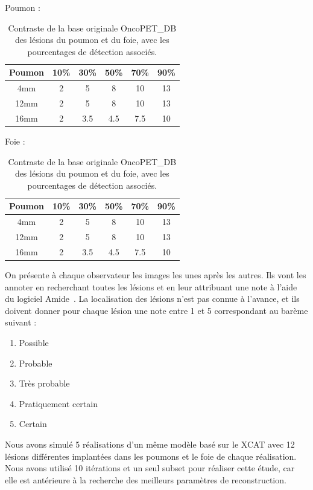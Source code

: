 \begin{table}
\centering
Poumon :\\
\begin{tabular}{|c||c|c|c|c|c|}
 \hline
Poumon	& 10\% & 30\% & 50\% & 70\% & 90\% \\
\hline
4mm	& 2    &  5   &  8   & 10   & 13   \\
\hline
12mm    & 2    &  5   &  8   & 10   & 13   \\
\hline
16mm    & 2    &  3.5 &  4.5 & 7.5  & 10   \\
\hline
\end{tabular}

\vspace{0.5cm}

Foie :\\
\begin{tabular}{|c||c|c|c|c|c|}
 \hline
Poumon	& 10\% & 30\% & 50\% & 70\% & 90\% \\
\hline
4mm	& 2    &  5   &  8   & 10   & 13   \\
\hline
12mm    & 2    &  5   &  8   & 10   & 13   \\
\hline
16mm    & 2    &  3.5 &  4.5 & 7.5  & 10   \\
\hline
\end{tabular}
\caption[Contraste de la base originale OncoPET\_DB des lésions du poumon et du foie pour létude de détectabilité]{Contraste de la base originale OncoPET\_DB des lésions du poumon et du foie, avec les pourcentages de détection associés.}
\label{fig:contrtasteFoiePoumonOrig}
\end{table}


On présente à chaque observateur les images les unes après les autres. Ils vont les annoter en recherchant toutes les lésions et en leur attribuant une note à l'aide du logiciel Amide~\cite{loening2003amide}. La localisation des lésions n'est pas connue à l'avance, et ils doivent donner pour chaque lésion une note entre 1 et 5 correspondant au barème suivant :

\begin{enumerate}
\item Possible
\item Probable
\item Très probable
\item Pratiquement  certain
\item Certain
\end{enumerate}

Nous avons simulé 5 réalisations d'un même modèle basé sur le XCAT avec 12 lésions différentes implantées dans les poumons et le foie de chaque réalisation. Nous avons utilisé 10 itérations et un seul subset pour réaliser cette étude, car elle est antérieure à la recherche des meilleurs paramètres de reconstruction.

